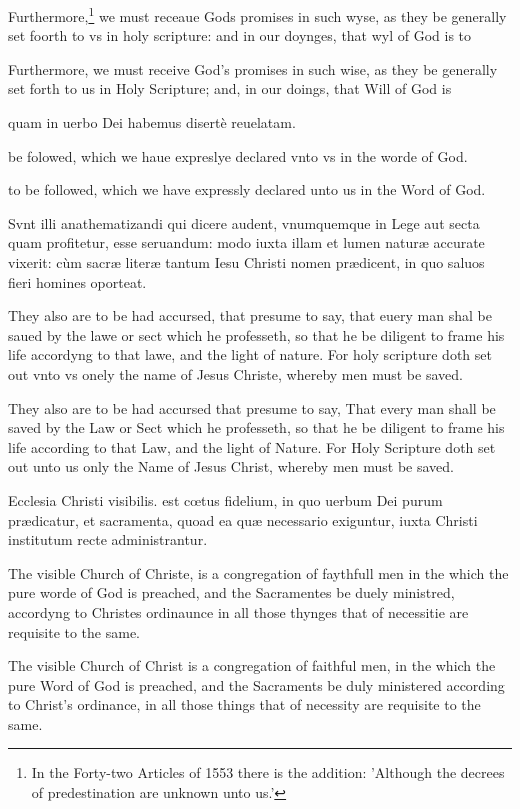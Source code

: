 Furthermore,\footnote{In the Forty-two Articles of 1553 there is the addition: 'Although the decrees of predestination are unknown unto us.'} we must receaue Gods promises in such wyse, as they be generally set foorth to vs in holy scripture: and in our doynges, that wyl of God is to

Furthermore, we must receive God's promises in such wise, as they be generally set forth to us in Holy Scripture; and, in our doings, that Will of God is

quam in uerbo Dei habemus disertè reuelatam.

be folowed, which we haue expreslye declared vnto vs in the worde of God.

to be followed, which we have expressly declared unto us in the Word of God.


Svnt illi anathematizandi qui dicere audent, vnumquemque in Lege aut secta quam profitetur, esse seruandum: modo iuxta illam et lumen naturæ accurate vixerit: cùm sacræ literæ tantum Iesu Christi nomen prædicent, in quo saluos fieri homines oporteat.

They also are to be had accursed, that presume to say, that euery man shal be saued by the lawe or sect which he professeth, so that he be diligent to frame his life accordyng to that lawe, and the light of nature. For holy scripture doth set out vnto vs onely the name of Jesus Christe, whereby men must be saved.

They also are to be had accursed that presume to say, That every man shall be saved by the Law or Sect which he professeth, so that he be diligent to frame his life according to that Law, and the light of Nature. For Holy Scripture doth set out unto us only the Name of Jesus Christ, whereby men must be saved.


Ecclesia Christi visibilis. est cœtus fidelium, in quo uerbum Dei purum prædicatur, et sacramenta, quoad ea quæ necessario exiguntur, iuxta Christi institutum recte administrantur.

The visible Church of Christe, is a congregation of faythfull men in the which the pure worde of God is preached, and the Sacramentes be duely ministred, accordyng to Christes ordinaunce in all those thynges that of necessitie are requisite to the same.

The visible Church of Christ is a congregation of faithful men, in the which the pure Word of God is preached, and the Sacraments be duly ministered according to Christ's ordinance, in all those things that of necessity are requisite to the same.

